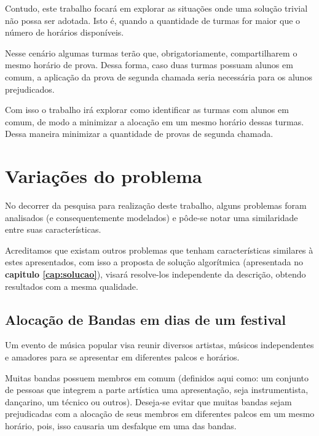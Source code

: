 Contudo, este trabalho focará em explorar as situações onde uma solução trivial não possa ser adotada. Isto é, quando a quantidade de turmas for maior que o número de horários disponíveis.


Nesse cenário algumas turmas terão que, obrigatoriamente, compartilharem o mesmo horário de prova. Dessa forma, caso duas turmas possuam alunos em comum, a aplicação da prova de segunda chamada seria necessária para os alunos prejudicados.

Com isso o trabalho irá explorar como identificar as turmas com alunos em comum, de modo a minimizar a alocação em um mesmo horário dessas turmas. Dessa maneira minimizar a quantidade de provas de segunda chamada.





\section{Variações do problema}

No decorrer da pesquisa para realização deste trabalho, alguns problemas foram analisados (e consequentemente modelados) e pôde-se notar uma similaridade entre suas características.

Acreditamos que existam outros problemas que tenham características similares à estes apresentados, com isso a proposta de solução algorítmica (apresentada no \textbf{capitulo \ref{cap:solucao}}), visará resolve-los independente da descrição, obtendo resultados com a mesma qualidade.



\subsection{Alocação de Bandas em dias de um festival}
Um evento de música popular visa reunir diversos artistas, músicos independentes e amadores para se apresentar em diferentes palcos e horários. 

Muitas bandas possuem membros em comum (definidos aqui como: um conjunto de pessoas que integrem a parte artística uma apresentação, seja instrumentista, dançarino, um técnico ou outros). Deseja-se evitar que muitas bandas sejam prejudicadas com a alocação de seus membros em diferentes palcos em um mesmo horário, pois, isso causaria um desfalque em uma das bandas.


